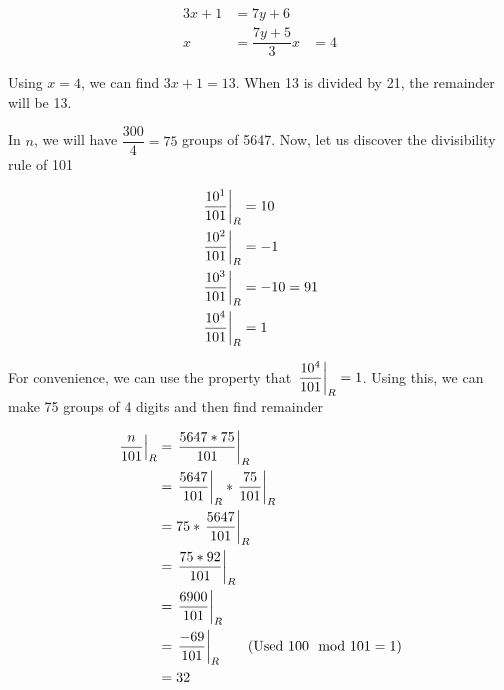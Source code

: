 \begin{align*}
    3x + 1 &= 7y + 6 \\
    x &= \dfrac{7y + 5}{3}
    x &= 4 \tag{y = 1}
\end{align*}

Using $x=4$, we can find $3x + 1 = 13$. When 13 is divided by 21, the remainder will be 13.


In $n$, we will have $\dfrac{300}{4} = 75$ groups of 5647. Now, let us discover the divisibility rule of 101

\begin{align*}
    \displaystyle{ \left. \frac{10^1}{101} \right |_{R} } &= 10 \\
    \displaystyle{ \left. \frac{10^2}{101} \right |_{R} } &= -1 \\
    \displaystyle{ \left. \frac{10^3}{101} \right |_{R} } &= -10 = 91 \\
    \displaystyle{ \left. \frac{10^4}{101} \right |_{R} } &= 1 \\
\end{align*}

For convenience, we can use the property that $\displaystyle{ \left. \frac{10^4}{101} \right |_{R} } = 1$. Using this, we can make 75 groups of 4 digits and then find remainder

\begin{align*}
    \displaystyle{ \left. \frac{n}{101} \right |_{R} } &= \displaystyle{ \left. \frac{5647 * 75}{101} \right |_{R} } \\
    &= \displaystyle{ \left. \frac{5647}{101} \right |_{R} } * \displaystyle{ \left. \frac{75}{101} \right |_{R} } \\
    &= 75 * \displaystyle{ \left. \frac{5647}{101} \right |_{R} } \\
    &= \displaystyle{ \left. \frac{75 * 92}{101} \right |_{R} } \\
    &= \displaystyle{ \left. \frac{6900}{101} \right |_{R} } \\
    &= \displaystyle{ \left. \frac{-69}{101} \right |_{R} } \tag{Used $100 \mod 101 = 1$} \\
    &= 32
\end{align*}
